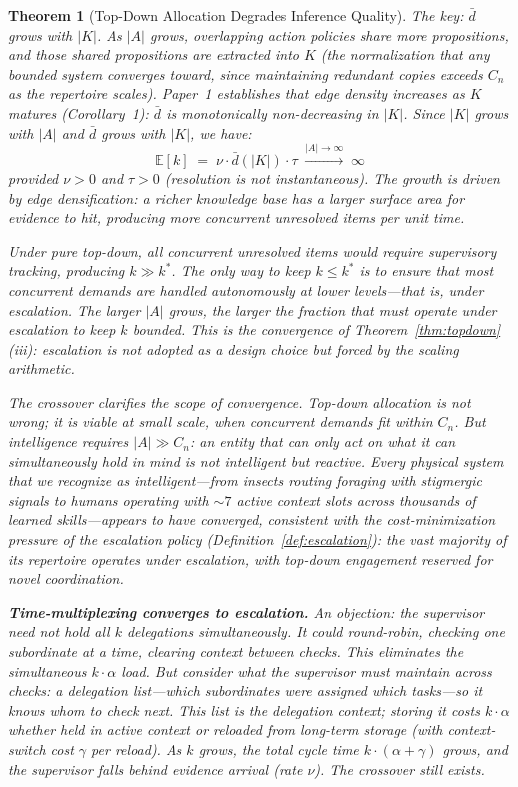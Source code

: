 \documentclass[11pt]{article}
\newtheorem{theorem}{Theorem}
\theoremstyle{definition}
\begin{document}
\begin{theorem}[Top-Down Allocation Degrades Inference Quality]
The key: $\bar{d}$ grows with $|K|$. As $|A|$ grows, overlapping
action policies share more propositions, and those shared propositions
are extracted into $K$ (the normalization that any bounded system
converges toward, since maintaining redundant copies exceeds $C_n$ as
the repertoire scales). Paper~1 \cite{McCarthy2026a} establishes that
edge density increases as $K$ matures (Corollary~1): $\bar{d}$ is
monotonically non-decreasing in $|K|$. Since $|K|$ grows with $|A|$
and $\bar{d}$ grows with $|K|$, we have:
\[
\mathbb{E}[k] \;=\; \nu \cdot \bar{d}(|K|) \cdot \tau
\;\xrightarrow{|A| \to \infty}\; \infty
\]
provided $\nu > 0$ and $\tau > 0$ (resolution is not instantaneous).
The growth is driven by edge densification: a richer knowledge base has
a larger surface area for evidence to hit, producing more concurrent
unresolved items per unit time.

Under pure top-down, all concurrent unresolved items would require
supervisory tracking, producing $k \gg k^*$. The only way to keep
$k \leq k^*$ is to ensure that most concurrent demands are handled
autonomously at lower levels---that is, under escalation. The larger
$|A|$ grows, the larger the fraction that must operate under
escalation to keep $k$ bounded. This is the convergence of
Theorem~\ref{thm:topdown}(iii): escalation is not adopted as a
design choice but forced by the scaling arithmetic.

The crossover clarifies the scope of convergence. Top-down allocation
is not wrong; it is viable at small scale, when concurrent demands fit
within $C_n$. But intelligence requires $|A| \gg C_n$: an entity that
can only act on what it can simultaneously hold in mind is not
intelligent but reactive. Every physical system that we recognize as
intelligent---from insects routing foraging with stigmergic signals to
humans operating with ${\sim}7$ active context slots across thousands of
learned skills---appears to have converged, consistent with the
cost-minimization pressure of the escalation policy
(Definition~\ref{def:escalation}):
the vast majority of its repertoire operates under escalation, with
top-down engagement reserved for novel coordination.

\textbf{Time-multiplexing converges to escalation.}
An objection: the supervisor need not hold all $k$ delegations
simultaneously. It could round-robin, checking one subordinate at a
time, clearing context between checks. This eliminates the simultaneous
$k \cdot \alpha$ load. But consider what the supervisor must maintain
across checks: a \emph{delegation list}---which subordinates were
assigned which tasks---so it knows whom to check next. This list is the
delegation context; storing it costs $k \cdot \alpha$ whether held in
active context or reloaded from long-term storage (with context-switch
cost $\gamma$ per reload). As $k$ grows, the total cycle time $k \cdot
(\alpha + \gamma)$ grows, and the supervisor falls behind evidence
arrival (rate $\nu$). The crossover still exists.


\end{theorem}
\end{document}
